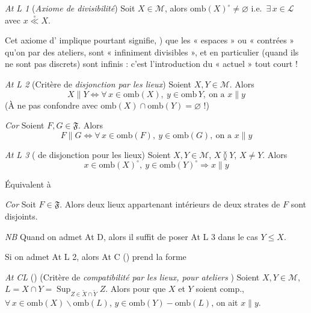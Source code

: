 \documentclass[11pt,a4paper]{article}
\begin{document}
\emph{At L 1} (\emph{Axiome de divisibilité}) Soit $X \in \mathcal{M}$, alors $\mathrm{omb}(X)^{\circ} \neq \varnothing$ i.e.\ $\exists\, x \in \mathcal{L}$ avec $x \mathrel{\overset{\circ}{\ll}} X$.

Cet axiome d'  implique pourtant  signifie, \uncertain{\ill{}}) que les « espaces » ou « contrées » qu'on  par des ateliers, sont « infiniment divisibles », et en particulier (quand ils ne sont pas discrets) sont infinis : c'est l'introduction du «  actuel » tout court !

\emph{At L 2} (Critère de \emph{disjonction par les lieux}) Soient $X, Y \in \mathcal{M}$. Alors
\[
  X \parallel Y \Longleftrightarrow \forall\, x \in \mathrm{omb}(X),\ y \in \mathrm{omb}\, Y,\ \text{on a } x \parallel y
\]
(À ne pas confondre avec $\mathrm{omb}(X) \cap \mathrm{omb}(Y) = \varnothing$ !)

\emph{Cor} \quad Soient $F, G \in \mathfrak{F}$. Alors
\[
  F \parallel G \Longleftrightarrow \forall\, x \in \mathrm{omb}(F),\ y \in \mathrm{omb}(G),\ \text{on a } x \parallel y
\]

\emph{At L 3} (  de disjonction pour les lieux) Soient $X, Y \in \mathcal{M}$, \struck{\ill{}} $X \between Y$, $X \neq Y$. Alors
\[
  x \in \mathrm{omb}(X)^{\circ},\ y \in \mathrm{omb}(Y)^{\circ} \Longrightarrow x \parallel y
\]


Équivalent à

\emph{Cor} \quad Soit $F \in \mathfrak{F}$. Alors deux lieux appartenant  intérieurs de deux strates  de $F$ sont disjoints.

\emph{NB} \quad Quand on admet At D, alors il suffit de poser At L 3 dans le cas $Y \leq X$.

Si on admet At L 2, alors  At C ()  prend la forme

\emph{At CL} () (Critère de \emph{compatibilité par les lieux, pour ateliers}  ) Soient $X, Y \in \mathcal{M}$, $L = X \cap Y = \mathop{\mathrm{Sup}}_{Z \in \widetilde{X} \cap \widetilde{Y}} Z$. Alors pour que $X$ et $Y$ soient comp.,   $\forall\, x \in \mathrm{omb}(X) \smallsetminus \mathrm{omb}(L)$, $y \in \mathrm{omb}(Y) - \mathrm{omb}(L)$, on ait $x \parallel y$.
\end{document}
